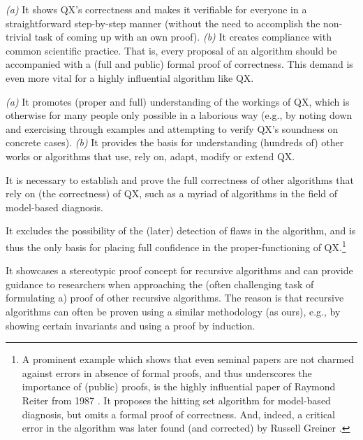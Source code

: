 \documentclass[]{elsarticle}
\begin{document}
	\begin{description}[noitemsep,leftmargin=16pt]
		\item[Proof Effect] \emph{(a)} It shows  QX's correctness and makes it 
		verifiable for everyone in a straightforward step-by-step manner (without the need to accomplish the non-trivial task of coming up with an own proof). \emph{(b)} It creates compliance with common scientific practice. That is, every proposal of an algorithm
		should be accompanied with a (full and public) formal proof of correctness. This demand is even more vital for a highly influential algorithm like QX.
		\item[Didactic Effect] \emph{(a)} 
		It promotes (proper and full) understanding \cite{hanna1996proof}
		of the workings of QX, which is otherwise for many people only possible in a laborious way (e.g., by noting down and exercising through examples and attempting to verify QX's soundness on concrete cases). \emph{(b)} It provides the basis for understanding (hundreds of) other works or algorithms that use, rely on, adapt, modify or extend QX.
		\item[Completeness Effect] It is necessary to establish and prove the full correctness of other algorithms that rely on (the correctness) of QX, such as a myriad of algorithms in the field of model-based diagnosis.
		\item[Trust and Sustainability Effect] It excludes the possibility of the (later) detection of flaws in the algorithm, and is thus the only basis for placing full confidence in the proper-functioning of QX.\footnote{A prominent example which shows that even seminal papers are not charmed against errors in absence of formal proofs, and thus underscores the importance of (public) proofs, is the highly influential paper of Raymond Reiter from 1987 \cite{Reiter87}. It proposes the hitting set algorithm for model-based diagnosis, but omits a formal proof of correctness. And, indeed, a critical error in the algorithm was later found (and corrected) by Russell Greiner \cite{greiner1989correction}.}
		\item[Transfer Effect] It showcases a stereotypic proof concept for recursive algorithms and can provide guidance to researchers when approaching the (often challenging task of formulating a) proof of other recursive algorithms. The reason is that recursive algorithms can often be proven using a similar methodology (as ours), e.g., by showing certain invariants and using a proof by induction.
	\end{description}
	
\end{document}
